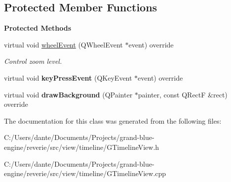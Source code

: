 \subsection*{Protected Member Functions}
\begin{Indent}\textbf{ Protected Methods}\par
\begin{DoxyCompactItemize}
\item 
\mbox{\label{classrev_1_1_view_1_1_timeline_view_a5a1e4376bb97d2b06498d2c7f0908a49}} 
virtual void \mbox{\hyperlink{classrev_1_1_view_1_1_timeline_view_a5a1e4376bb97d2b06498d2c7f0908a49}{wheel\+Event}} (Q\+Wheel\+Event $\ast$event) override
\begin{DoxyCompactList}\small\item\em Control zoom level. \end{DoxyCompactList}\item 
\mbox{\label{classrev_1_1_view_1_1_timeline_view_a5ff41c2a3f1bf62d9a2b0dc61dbbd410}} 
virtual void {\bfseries key\+Press\+Event} (Q\+Key\+Event $\ast$event) override
\item 
\mbox{\label{classrev_1_1_view_1_1_timeline_view_aebeed8a717a3c96c9974418ae498049d}} 
virtual void {\bfseries draw\+Background} (Q\+Painter $\ast$painter, const Q\+RectF \&rect) override
\end{DoxyCompactItemize}
\end{Indent}


The documentation for this class was generated from the following files\+:\begin{DoxyCompactItemize}
\item 
C\+:/\+Users/dante/\+Documents/\+Projects/grand-\/blue-\/engine/reverie/src/view/timeline/G\+Timeline\+View.\+h\item 
C\+:/\+Users/dante/\+Documents/\+Projects/grand-\/blue-\/engine/reverie/src/view/timeline/G\+Timeline\+View.\+cpp\end{DoxyCompactItemize}
